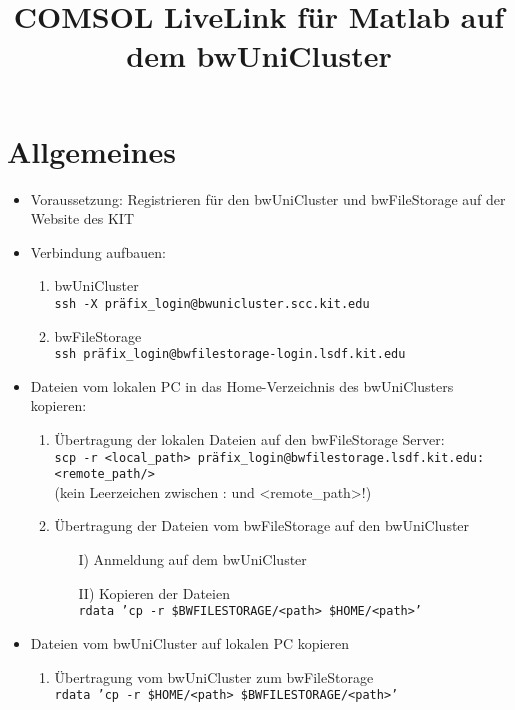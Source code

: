 \documentclass[12pt]{scrartcl}%
\theoremstyle{nonumberplain}
\begin{document}
\author{}
\title{COMSOL LiveLink für Matlab auf dem bwUniCluster}
\date{} %

\maketitle %

\section{Allgemeines}

\begin{itemize}
\item Voraussetzung: Registrieren für den bwUniCluster und bwFileStorage auf der Website des KIT 
\item Verbindung aufbauen:
\begin{enumerate}
\item bwUniCluster  \\ \texttt{ssh -X präfix\_login@bwunicluster.scc.kit.edu}
\item bwFileStorage \\ \texttt{ssh präfix\_login@bwfilestorage-login.lsdf.kit.edu}
\end{enumerate}
\item Dateien vom lokalen PC in das Home-Verzeichnis des bwUniClusters kopieren:
\begin{enumerate}
\item Übertragung der lokalen Dateien auf den bwFileStorage Server: \\ \texttt{scp -r <local\_path> präfix\_login@bwfilestorage.lsdf.kit.edu:<remote\_path/>} \\
(kein Leerzeichen zwischen : und <remote\_path>!)
\item Übertragung der Dateien vom bwFileStorage auf den bwUniCluster
\begin{enumerate}
\item[I)] Anmeldung auf dem bwUniCluster
\item[II)] Kopieren der Dateien \\ \texttt{rdata 'cp -r \$BWFILESTORAGE/<path> \$HOME/<path>'}
\end{enumerate}
\end{enumerate}
\item Dateien vom bwUniCluster auf lokalen PC kopieren
\begin{enumerate}
\item Übertragung vom bwUniCluster zum bwFileStorage \\ \texttt{rdata 'cp -r \$HOME/<path> \$BWFILESTORAGE/<path>'}

\end{enumerate}
\end{itemize}
\end{document}
